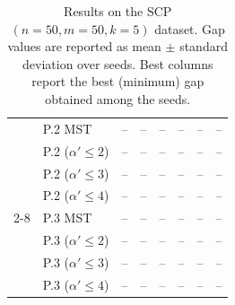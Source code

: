 \documentclass{article}
\begin{document}
\begin{table}[H]
{\begin{tabular}{llcccccc}
& P.2 MST
& --
& --
& --
& --
& --
& -- \\

& P.2 ($\alpha' \leq 2$)
& --
& --
& --
& --
& --
& -- \\

& P.2 ($\alpha' \leq 3$)
& --
& --
& --
& --
& --
& -- \\

& P.2 ($\alpha' \leq 4$)
& --
& --
& --
& --
& --
& -- \\
\cmidrule(lr){2-8}

& P.3 MST
& --
& --
& --
& --
& --
& -- \\

& P.3 ($\alpha' \leq 2$)
& --
& --
& --
& --
& --
& -- \\

& P.3 ($\alpha' \leq 3$)
& --
& --
& --
& --
& --
& -- \\

& P.3 ($\alpha' \leq 4$)
& --
& --
& --
& --
& --
& -- \\
\bottomrule
\end{tabular}}
\caption{Results on the SCP $(n=50,m=50,k=5)$ dataset. Gap values are reported as mean $\pm$ standard deviation over seeds. Best columns report the best (minimum) gap obtained among the seeds.}
\label{tab:scp50_results}
\end{table}
\end{document}
